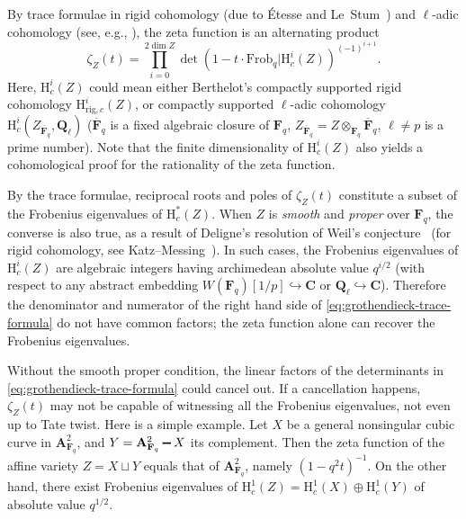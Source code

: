 \documentclass{amsart}
\numberwithin{equation}{section}
\theoremstyle{plain}
\theoremstyle{definition}
\renewcommand{\mathbb}{\mathbf}
\renewcommand{\setminus}{\mathbin{\rule[0.2em]{0.67em}{0.12em}}}%
\begin{document}
By trace formulae in rigid cohomology
(due to Étesse and Le~Stum~\cite{etesse-le-stum:l-functions-associated-to-overconvergent-f-isocrystals-1})
and \(\ell\)-adic cohomology (see, e.g., \cite[Rapport, \S\S4--6]{deligne:sga4.5}),
the zeta function is an alternating product
\begin{equation}\label{eq:grothendieck-trace-formula}
  \zeta_Z(t) = \prod_{i=0}^{2\dim Z} \det\left(1 - t\cdot \mathrm{Frob}_q | \mathrm{H}^{i}_{c}(Z)\right)^{(-1)^{i+1}}.
\end{equation}
Here, \(\mathrm{H}^{i}_c(Z)\) could mean either Berthelot's compactly supported
rigid cohomology \(\mathrm{H}^i_{\mathrm{rig},c}(Z)\),
or compactly supported \(\ell\)-adic cohomology \(\mathrm{H}^{i}_{c}(Z_{\overline{\mathbb{F}}_q},\mathbb{Q}_{\ell})\)
(\(\overline{\mathbb{F}}_{q}\) is a fixed algebraic closure of
\(\mathbb{F}_q\),
\(Z_{\overline{\mathbb{F}}_q}=Z\otimes_{\mathbb{F}_q}\overline{\mathbb{F}}_q\),
\(\ell\neq p\) is a prime number).  Note that the finite
dimensionality of \(\mathrm{H}^{i}_c(Z)\) also yields a cohomological
proof for the rationality of the zeta function.

By the trace formulae, reciprocal roots and poles of \(\zeta_{Z}(t)\) constitute
a subset of the Frobenius eigenvalues of
\(\mathrm{H}^{\ast}_{c}(Z)\).  When \(Z\) is
\emph{smooth} and \emph{proper} over \(\mathbb{F}_{q}\), the converse
is also true, as a result of Deligne's resolution of Weil's
conjecture~\cite[Théorème~1.6]{deligne:weil-1} (for rigid cohomology,
see Katz--Messing~\cite{katz-messing:consequence-riemann-hypothesis}).
In such cases, the Frobenius eigenvalues of \(\mathrm{H}^{i}_{c}(Z)\)
are algebraic integers having archimedean absolute value \(q^{i/2}\) (with
respect to any abstract embedding
\(W(\mathbb{F}_{q})[1/p]\hookrightarrow \mathbb{C}\) or
\(\mathbb{Q}_{\ell}\hookrightarrow \mathbb{C}\)).  Therefore the
denominator and numerator of the right hand side of
\eqref{eq:grothendieck-trace-formula} do not have common factors; the
zeta function alone can recover the Frobenius eigenvalues.

Without the smooth proper condition, the linear factors of the
determinants in \eqref{eq:grothendieck-trace-formula} could cancel
out.  If a cancellation happens, \(\zeta_Z(t)\) may not be capable of
witnessing all the Frobenius eigenvalues, not even up to Tate twist.
Here is a simple example.  Let \(X\) be a general nonsingular cubic
curve in \(\mathbb{A}^{2}_{\mathbb{F}_q}\), and
\(Y = \mathbb{A}^2_{\mathbb{F}_q} \setminus X\) its complement.  Then
the zeta function of the affine variety \(Z=X \sqcup Y\) equals that
of \(\mathbb{A}^2_{\mathbb{F}_q}\), namely \((1-q^{2}t)^{-1}\). On the
other hand, there exist Frobenius eigenvalues of
\(\mathrm{H}^1_{c}(Z) = \mathrm{H}^1_{c}(X) \oplus \mathrm{H}^1_{c}(Y)\) of
absolute value \(q^{1/2}\).
\end{document}
